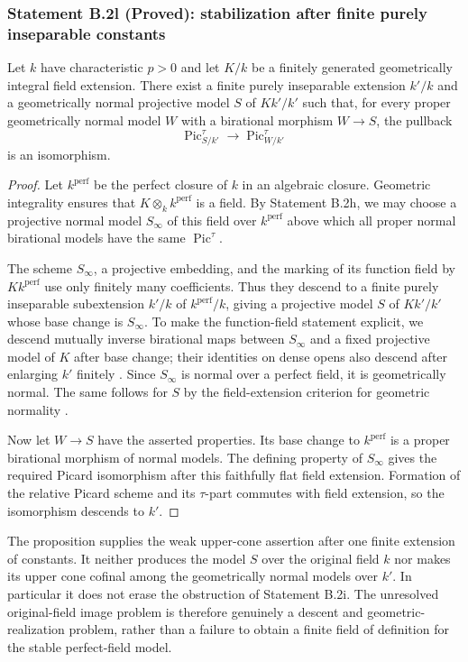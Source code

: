 \subsubsection*{Statement B.2l (Proved): stabilization after finite purely inseparable constants}
\begin{proposition}
\label{B:B2-finite-constants}
Let $k$ have characteristic $p>0$ and let $K/k$ be a finitely
generated geometrically integral field extension.  There exist a
finite purely inseparable extension $k'/k$ and a geometrically normal
projective model $S$ of $Kk'/k'$ such that, for every proper
geometrically normal model $W$ with a birational morphism $W\to S$,
the pullback
\[
 \operatorname{Pic}^{\tau}_{S/k'}\longrightarrow
 \operatorname{Pic}^{\tau}_{W/k'}
\]
is an isomorphism.
\end{proposition}
\begin{proof}
Let $k^{\mathrm{perf}}$ be the perfect closure of $k$ in an algebraic
closure.  Geometric integrality ensures that
$K\otimes_k k^{\mathrm{perf}}$ is a field.  By Statement B.2h,
we may choose a projective normal model $S_{\infty}$ of this field
over $k^{\mathrm{perf}}$ above which all proper normal birational
models have the same $\operatorname{Pic}^{\tau}$.

The scheme $S_{\infty}$, a projective embedding, and the marking
of its function field by $Kk^{\mathrm{perf}}$ use only finitely
many coefficients.  Thus they descend to a finite purely inseparable
subextension $k'/k$ of $k^{\mathrm{perf}}/k$, giving a projective
model $S$ of $Kk'/k'$ whose base change is $S_{\infty}$.
To make the function-field statement explicit, we descend mutually
inverse birational maps between $S_{\infty}$ and a fixed projective
model of $K$ after base change; their identities on dense opens
also descend after enlarging $k'$ finitely
\cite[Lemma 32.10.1, Tag 01ZM]{StacksB}.
Since $S_{\infty}$ is normal over a perfect field, it is
geometrically normal.  The same follows for $S$ by the field-extension
criterion for geometric normality
\cite[Lemmas 33.10.3--4, Tags 038O and 038P]{StacksB}.

Now let $W\to S$ have the asserted properties.  Its base change
to $k^{\mathrm{perf}}$ is a proper birational morphism of normal
models.  The defining property of $S_{\infty}$ gives the required
Picard isomorphism after this faithfully flat field extension.
Formation of the relative Picard scheme and its $\tau$-part commutes
with field extension, so the isomorphism descends to $k'$.
\end{proof}

\begin{remark}
The proposition supplies the weak upper-cone assertion after one
finite extension of constants.  It neither produces the model $S$
over the original field $k$ nor makes its upper cone cofinal among
the geometrically normal models over $k'$.  In particular it does
not erase the obstruction of Statement B.2i.  The unresolved
original-field image problem is therefore genuinely a descent and
geometric-realization problem, rather than a failure to obtain a
finite field of definition for the stable perfect-field model.
\end{remark}
